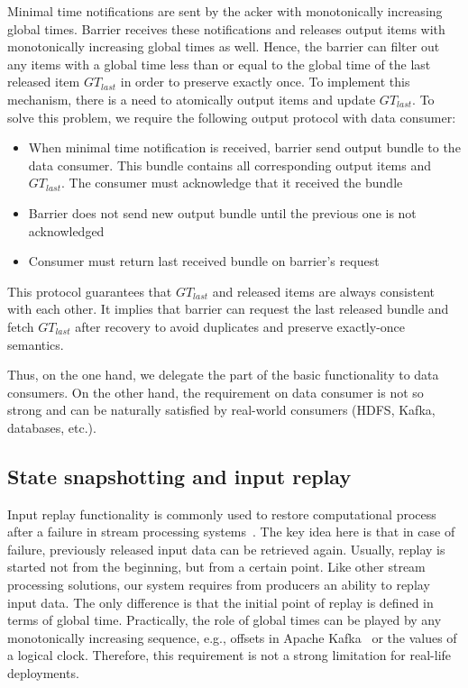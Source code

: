 Minimal time notifications are sent by the acker with monotonically increasing global times. Barrier receives these notifications and releases output items with monotonically increasing global times as well. Hence, the barrier can filter out any items with a global time less than or equal to the global time of the last released item $GT_{last}$ in order to preserve exactly once. To implement this mechanism, there is a need to atomically output items and update $GT_{last}$. To solve this problem, we require the following output protocol with data consumer: 

\begin{itemize}
    \item When minimal time notification is received, barrier send output bundle to the data consumer. This bundle contains all corresponding output items and $GT_{last}$. The consumer must acknowledge that it received the bundle
    \item Barrier does not send new output bundle until the previous one is not acknowledged
    \item Consumer must return last received bundle on barrier's request 
\end{itemize}

This protocol guarantees that $GT_{last}$ and released items are always consistent with each other. It implies that barrier can request the last released bundle and fetch $GT_{last}$ after recovery to avoid duplicates and preserve exactly-once semantics.

Thus, on the one hand, we delegate the part of the basic functionality to data consumers. On the other hand, the requirement on data consumer is not so strong and can be naturally satisfied by real-world consumers (HDFS, Kafka, databases, etc.). 


\subsection{State snapshotting and input replay}

Input replay functionality is commonly used to restore computational process after a failure in stream processing systems~\cite{Carbone:2017:SMA:3137765.3137777, Akidau:2013:MFS:2536222.2536229, apache:storm}. The key idea here is that in case of failure, previously released input data can be retrieved again. Usually, replay is started not from the beginning, but from a certain point. Like other stream processing solutions, our system requires from producers an ability to replay input data. The only difference is that the initial point of replay is defined in terms of global time. Practically, the role of global times can be played by any monotonically increasing sequence, e.g., offsets in Apache Kafka~\cite{kreps2011kafka} or the values of a logical clock. Therefore, this requirement is not a strong limitation for real-life deployments.

